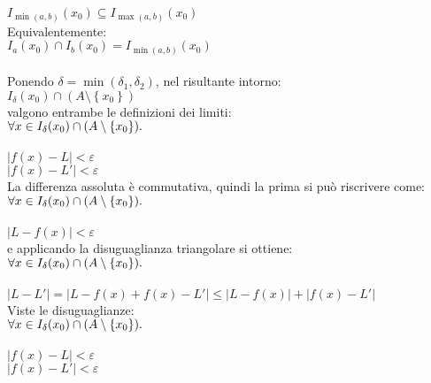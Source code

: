 \documentclass[a4paper, twoside, italian, 11pt]{book}
\newcommand{\braces}[1] {\left \{ #1 \right \}}
\newcommand{\abs}[1] {\left | #1 \right |}
\begin{document}
\noindent
$I_{\min(a, b)}(x_0) \subseteq I_{\max(a, b)}(x_0)$ \\

\noindent
Equivalentemente: \\

\noindent
$I_a(x_0) \cap I_b(x_0) = I_{\min(a, b)}(x_0)$ \\\\


\noindent
Ponendo $\delta = \min(\delta_1, \delta_2)$, nel risultante intorno: \\

$I_\delta(x_0) \cap (A \setminus \braces{x_0})$ \\

\noindent
valgono entrambe le definizioni dei limiti: \\

$\forall x \in I_\delta(x_0) \cap (A \setminus \braces{x_0}) \ldotp$ \\\\
\indent
$\abs{f(x) - L} < \varepsilon$ \\
\indent
$\abs{f(x) - L'} < \varepsilon$ \\

\noindent
La differenza assoluta è commutativa, quindi la prima si può riscrivere come: \\

$\forall x \in I_\delta(x_0) \cap (A \setminus \braces{x_0}) \ldotp$ \\\\
\indent
$\abs{L - f(x)} < \varepsilon$ \\

\noindent
e applicando la disuguaglianza triangolare si ottiene: \\

$\forall x \in I_\delta(x_0) \cap (A \setminus \braces{x_0}) \ldotp$ \\\\
\indent
$\abs{L - L'} = \abs{L - f(x) + f(x) - L'} \leq \abs{L - f(x)} + \abs{f(x) - L'}$ \\

\noindent
Viste le disuguaglianze: \\

$\forall x \in I_\delta(x_0) \cap (A \setminus \braces{x_0}) \ldotp$ \\\\
\indent
$\abs{f(x) - L} < \varepsilon$ \\
\indent
$\abs{f(x) - L'} < \varepsilon$ \\
\end{document}
